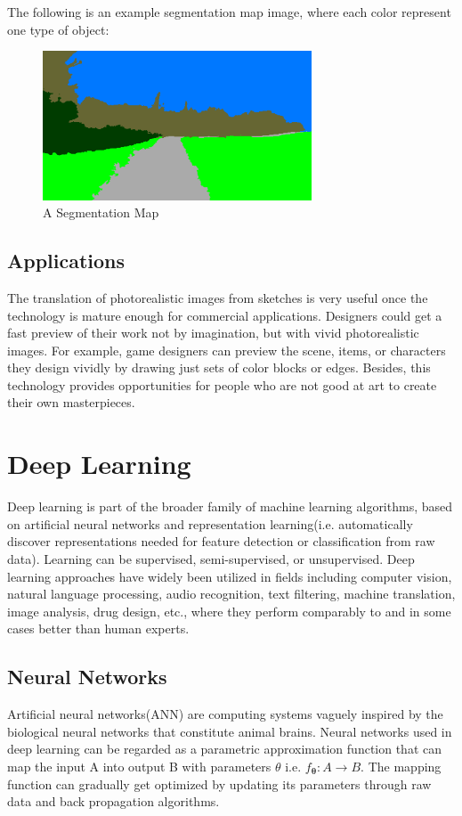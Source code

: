 The following is an example segmentation map image, where each color represent one type of object:
\begin{figure}
    \begin{center}
    \includegraphics[width=8cm]{figures/seg-map-eg}
    \end{center}
    \caption{A Segmentation Map}
    \label{fig:segmentation-map-example}
\end{figure}

\subsection{Applications}
The translation of photorealistic images from sketches is very useful once the technology is 
mature enough for commercial applications. Designers could get a fast preview of 
their work not by imagination, but with vivid photorealistic images. For example, 
game designers can preview the scene, items, or characters they design vividly by drawing 
just sets of color blocks or edges. Besides, this technology provides opportunities for 
people who are not good at art to create their own masterpieces.


\section{Deep Learning}
Deep learning is part of the broader family of machine learning algorithms, based on
artificial neural networks and representation learning(i.e. automatically discover 
representations needed for feature detection or classification from raw data). Learning
can be supervised, semi-supervised, or unsupervised. Deep learning approaches have widely
been utilized in fields including computer vision, natural language processing, 
audio recognition, text filtering, machine translation, image analysis, drug design, etc., 
where they perform comparably to and in some cases better than human experts.  

\subsection{Neural Networks}
Artificial neural networks(ANN) are computing systems vaguely inspired by the biological 
neural networks that constitute animal brains. Neural networks used in deep learning 
can be regarded as a parametric approximation function that can map the input A into output
B with parameters $\theta$ i.e. $f_{\boldsymbol{\theta}}: A \rightarrow B$. The mapping 
function can gradually get optimized by updating its parameters through raw data and back 
propagation algorithms. 

